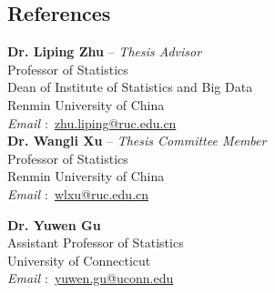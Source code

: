 \documentclass[margin,line]{resume-bib}
\begin{document}
\begin{resume}
\section{\mysidestyle References} 
\vspace{0mm}
\begin{multicols}{2}
\textbf{Dr. Liping Zhu} -- \emph{Thesis Advisor} \\
\indent \hspace{3mm} Professor of Statistics\\ 
\indent \hspace{3mm} Dean of Institute of Statistics and Big Data \\
\indent \hspace{3mm} Renmin University of China \\
\indent \hspace{3mm} \emph{Email $\!:$} \href{mailto:zhu.liping@ruc.edu.cn}{zhu.liping@ruc.edu.cn} \\

\vspace{-3mm}
\textbf{Dr. Wangli Xu} -- \emph{Thesis Committee Member}  \\
\indent \hspace{3mm} Professor of Statistics \\
\indent \hspace{3mm} Renmin University of China \\
\indent \hspace{3mm} \emph{Email $\!:$} \href{mailto:wlxu@ruc.edu.cn}{wlxu@ruc.edu.cn} \\
\end{multicols}



\begin{multicols}{2}
{
\begingroup

\vspace{0mm}
\textbf{Dr. Yuwen Gu} \\
\indent \hspace{3mm} Assistant Professor of Statistics \\
\indent \hspace{3mm} University of Connecticut \\
\indent \hspace{3mm} \emph{Email $\!:$} \href{mailto:yuwen.gu@uconn.edu}{yuwen.gu@uconn.edu} \\


}
\end{multicols}
\end{resume}
\end{document}

